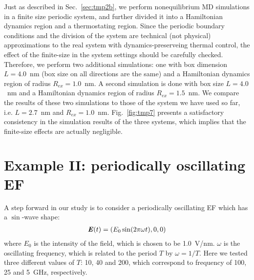 \documentclass[a4paper,preprint,unsortedaddress,onecolumn]{revtex4-1}
\newcommand{\vect}[1]{\textbf{\textit{#1}}}
\begin{document}
Just as described in Sec.~\ref{sec:tmp2b}, we perform nonequilibrium MD
simulations in a finite size periodic system, and further divided it
into a Hamiltonian dynamics region and a thermostating region.
Since the periodic boundary conditions and the division of the system
are technical (not physical) approximations to the real system with dynamics-preserveing thermal control, 
the effect of the finite-size in 
the system settings should be carefully checked.
Therefore, we
perform two additional simulations: one with box dimension $L=4.0$~nm (box size on all directions are the same) and a
Hamiltonian dynamics region of radius $R_{ex} = 1.0$~nm. A second simulation is done with box size $L=4.0$~nm and a Hamiltonian dynamics region of
radius $R_{ex} = 1.5$~nm. We compare the results of these two simulations to those of the system we have used so far, i.e. $L=2.7$~nm and $R_{ex} = 1.0$~nm.
Fig.~\ref{fig:tmp7} presents a satisfactory consistency in
the simulation results of the three systems, which implies that the finite-size effects are
actually negligible.



\section{Example II:
  periodically oscillating EF}

A step forward in our study is to consider a periodically oscillating EF which has
a $\sin$-wave shape:
\begin{align}
  \vect E(t) = (E_0\sin(2\pi \omega t), 0, 0)
\end{align}
where $E_0$ is the intensity of the field, which is chosen to be
1.0~V/nm.  $\omega$ is the oscillating frequency, which is related to
the period $T$ by $\omega = 1/T$.  Here we tested three different
values of $T$: 10, 40 and 200, which correspond
to frequency of 100, 25 and 5~GHz, respectively.
\end{document}
